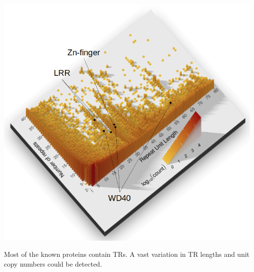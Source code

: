 \documentclass[a0paper,fleqn]{betterposter}
\begin{document}
{%


}{

\begin{center}
    \includegraphics[width=\textwidth]{figures/fig1_3D.png}
\end{center}
Most of the known proteins contain TRs. A vast variation in TR lengths and unit copy numbers could be detected.

}
\end{document}
